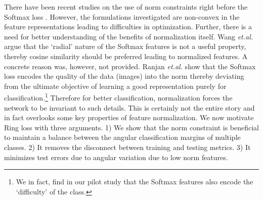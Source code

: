 \documentclass[10pt,twocolumn,letterpaper]{article}
\begin{document}
 
 There have been recent studies on the use of norm constraints right before the Softmax loss \cite{Wang2017NormFace, ranjan2017l2}. However, the formulations investigated are non-convex in the feature representations leading to difficulties in optimization. Further, there is a need for better understanding of the benefits of normalization itself. Wang \emph{et.al.} \cite{Wang2017NormFace} argue that the `radial' nature of the Softmax features is not a useful property, thereby cosine similarity should be preferred leading to normalized features. A concrete reason was, however, not provided. Ranjan \emph{et.al.} \cite{ranjan2017l2} show that the Softmax loss encodes the quality of the data (images) into the norm thereby deviating from the ultimate objective of learning a good representation purely for classification.\footnote{We in fact, find in our pilot study that the Softmax features also encode the `difficulty' of the class.} Therefore for better classification, normalization forces the network to be invariant to such details. This is certainly not the entire story and in fact overlooks some key properties of feature normalization. We now motivate Ring loss with three arguments. 1) We show that the norm constraint is beneficial to maintain a balance between the angular classification margins of multiple classes. 2) It removes the disconnect between training and testing metrics. 3) It minimizes test errors due to angular variation due to low norm features.   
 

\end{document}
